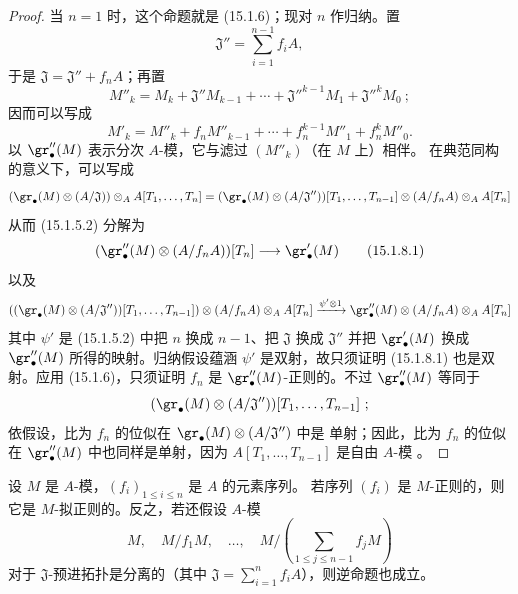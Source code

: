 \begin{proof}
当 $n=1$ 时，这个命题就是 (15.1.6)；现对 $n$ 作归纳。置
\[
  \mathfrak{J}''=\sum_{i=1}^{n-1}f_iA,
\]
于是 $\mathfrak{J}=\mathfrak{J}''+f_nA$；再置
\[
  M''_k=M_k+\mathfrak{J}''M_{k-1}+\cdots+
  \mathfrak{J}''^{k-1}M_1+\mathfrak{J}''^kM_0~;
\]
因而可以写成
\[
  M'_k=M''_k+f_nM''_{k-1}+\cdots+f_n^{k-1}M''_1+f_n^kM''_0.
\]
以 $\gr''_\bullet(M)$ 表示分次 $A$-模，它与滤过 $(M''_k)$（在 $M$ 上）相伴。
在典范同构的意义下，可以写成
\[
  (\gr_\bullet(M)\otimes(A/\mathfrak{J}))\otimes_A A[T_1,\ldots,T_n]
  =
  (\gr_\bullet(M)\otimes(A/\mathfrak{J}''))[T_1,\ldots,T_{n-1}]
  \otimes(A/f_nA)\otimes_A A[T_n]
\]
从而 (15.1.5.2) 分解为
\[
  (\gr''_\bullet(M)\otimes(A/f_nA))[T_n]\longrightarrow\gr'_\bullet(M)
  \tag{15.1.8.1}\label{0.15.1.8.1-fr}
\]
以及
\[
  ((\gr_\bullet(M)\otimes(A/\mathfrak{J}''))[T_1,\ldots,T_{n-1}])
  \otimes(A/f_nA)\otimes_A A[T_n]
  \xrightarrow{\psi'\otimes1}
  \gr''_\bullet(M)\otimes(A/f_nA)\otimes_A A[T_n]
\]
其中 $\psi'$ 是 (15.1.5.2) 中把 $n$ 换成 $n-1$、把
$\mathfrak{J}$ 换成 $\mathfrak{J}''$ 并把 $\gr'_\bullet(M)$ 换成
$\gr''_\bullet(M)$ 所得的映射。归纳假设蕴涵 $\psi'$ 是双射，故只须证明
(15.1.8.1) 也是双射。应用 (15.1.6)，只须证明 $f_n$ 是
$\gr''_\bullet(M)$-正则的。不过 $\gr''_\bullet(M)$ 等同于
\[
  (\gr_\bullet(M)\otimes(A/\mathfrak{J}''))
  [T_1,\ldots,T_{n-1}]~;
\]
依假设，比为 $f_n$ 的位似在 $\gr_\bullet(M)\otimes(A/\mathfrak{J}'')$ 中是
单射；因此，比为 $f_n$ 的位似在 $\gr''_\bullet(M)$ 中也同样是单射，因为
$A[T_1,\ldots,T_{n-1}]$ 是自由 $A$-模
。
\end{proof}

\begin{proposition}[15.1.9]
\label{0.15.1.9-fr}
设 $M$ 是 $A$-模，$(f_i)_{1\leq i\leq n}$ 是 $A$ 的元素序列。
若序列 $(f_i)$ 是 $M$-正则的，则它是 $M$-拟正则的。反之，若还假设
$A$-模
\[
  M,\quad M/f_1M,\quad\ldots,\quad
  M/\left(\sum_{1\leq j\leq n-1}f_jM\right)
\]
对于 $\mathfrak{J}$-预进拓扑是分离的（其中
$\mathfrak{J}=\sum_{i=1}^n f_iA$），则逆命题也成立。
\end{proposition}

